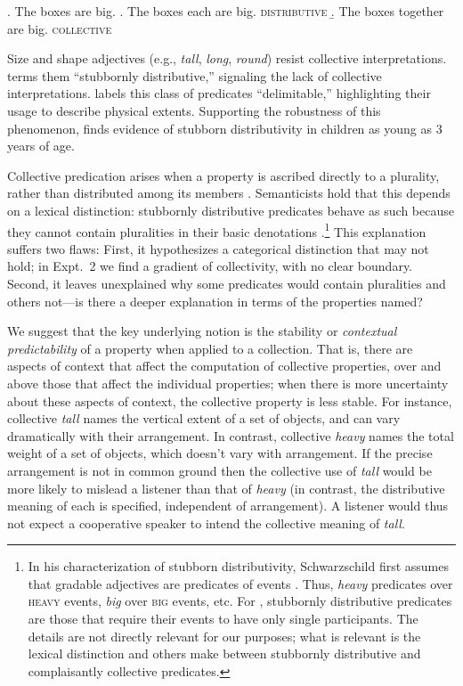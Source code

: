 \documentclass[linguex]{sp}
\begin{document}
\ex. The boxes are big.
\a. The boxes each are big. \hfill \textsc{distributive}
\b. The boxes together are big. \hfill {}\textsc{collective}

Size and shape adjectives (e.g., \emph{tall}, \emph{long}, \emph{round}) resist collective interpretations. \cite{schwarzschild2011} terms them ``stubbornly distributive,'' signaling the lack of collective interpretations. \citet{zhang2013} labels this class of predicates ``delimitable,'' highlighting their usage to describe physical extents. Supporting the robustness of this phenomenon, \cite{syrett2015} finds evidence of stubborn distributivity in children as young as 3 years of age.

Collective predication arises when a property is ascribed directly to a plurality, rather than distributed among its members \citep{link1983}. Semanticists hold that this depends on a lexical distinction: stubbornly distributive predicates behave as such because they cannot contain pluralities in their basic denotations \citep{schwarzschild2011,vazquezrojas2012,zhang2013}.\footnote{In his characterization of stubborn distributivity, Schwarzschild first assumes that gradable adjectives are predicates of events \citep[e.g.,][]{higginbothamschein1989}. Thus, \emph{heavy} predicates over \textsc{heavy} events, \emph{big} over \textsc{big} events, etc. For \citeauthor{schwarzschild2011}, stubbornly distributive predicates are those that require their events to have only single participants. The details are not directly relevant for our purposes; what is relevant is the lexical distinction \citeauthor{schwarzschild2011} and others make between stubbornly distributive and complaisantly collective predicates.}
This explanation suffers two flaws:
First, it hypothesizes a categorical distinction that may not hold; in Expt.~2 we find a gradient of collectivity, with no clear boundary.
Second, it leaves unexplained why some predicates would contain pluralities and others not---is there a deeper explanation in terms of the properties named?

We suggest that the key underlying notion is the stability or \emph{contextual predictability} of a property when applied to a collection.
That is, there are aspects of context that affect the computation of collective properties, over and above those that affect the individual properties; when there is more uncertainty about these aspects of context, the collective property is less stable.
For instance, collective \emph{tall} names the vertical extent of a set of objects, and can vary dramatically with their arrangement.
In contrast, collective \emph{heavy} names the total weight of a set of objects, which doesn't vary with arrangement. 
If the precise arrangement is not in common ground then the collective use of \emph{tall} would be more likely to mislead a listener than that of \emph{heavy} (in contrast, the distributive meaning of each is specified, independent of arrangement). A listener would thus not expect a cooperative speaker to intend the collective meaning of \emph{tall}.
\end{document}
